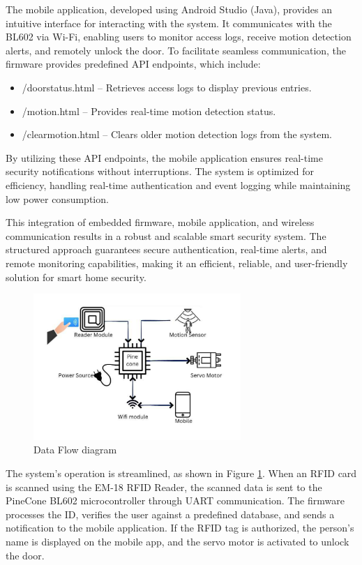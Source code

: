 \documentclass[a4paper]{scrartcl}
\begin{document}
The mobile application, developed using Android Studio (Java), provides an intuitive interface for interacting with the system. It communicates with the BL602 via Wi-Fi, enabling users to monitor access logs, receive motion detection alerts, and remotely unlock the door. To facilitate seamless communication, the firmware provides predefined API endpoints, which include:

\begin{itemize}
    \item /doorstatus.html – Retrieves access logs to display previous entries.
    \item /motion.html – Provides real-time motion detection status.
    \item /clearmotion.html – Clears older motion detection logs from the system.
\end{itemize}

By utilizing these API endpoints, the mobile application ensures real-time security notifications without interruptions. The system is optimized for efficiency, handling real-time authentication and event logging while maintaining low power consumption.

This integration of embedded firmware, mobile application, and wireless communication results in a robust and scalable smart security system. The structured approach guarantees secure authentication, real-time alerts, and remote monitoring capabilities, making it an efficient, reliable, and user-friendly solution for smart home security.

\begin{figure}[h]
    \centering
    \includegraphics[width=0.7\textwidth]{dfd.pdf}
    \caption{Data Flow diagram}
    \label{fig:dfd}
\end{figure}

The system's operation is streamlined, as shown in Figure \ref{fig:dfd}. When an RFID card is scanned using the EM-18 RFID Reader, the scanned data is sent to the PineCone BL602 microcontroller through UART communication. The firmware processes the ID, verifies the user against a predefined database, and sends a notification to the mobile application. If the RFID tag is authorized, the person's name is displayed on the mobile app, and the servo motor is activated to unlock the door.
\end{document}
